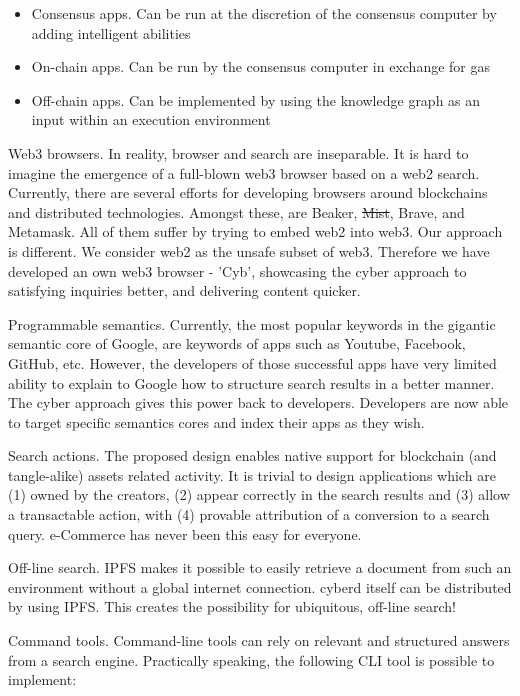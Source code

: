 \documentclass[8pt,oneside]{amsart}
\newcommand{\code}[1]{{\PlayBold #1}}
\begin{document}
\begin{Abstract}
\begin{itemize}
\item Consensus apps. Can be run at the discretion of the consensus computer by adding intelligent abilities
\item On-chain apps. Can be run by the consensus computer in exchange for gas
\item Off-chain apps. Can be implemented by using the knowledge graph as an input within an execution environment
\end{itemize}

\code{Web3 browsers}. In reality, browser and search are inseparable. It is hard to imagine the emergence of a full-blown web3 browser based on a web2 search. Currently, there are several efforts for developing browsers around blockchains and distributed technologies. Amongst these, are Beaker, \sout{Mist}, Brave, and Metamask. All of them suffer by trying to embed web2 into web3. Our approach is different. We consider web2 as the unsafe subset of web3. Therefore we have developed an own web3 browser - 'Cyb', showcasing the cyber approach to satisfying inquiries better, and delivering content quicker.

\code{Programmable semantics}. Currently, the most popular keywords in the gigantic semantic core of Google, are keywords of apps such as Youtube, Facebook, GitHub, etc. However, the developers of those successful apps have very limited ability to explain to Google how to structure search results in a better manner. The cyber approach gives this power back to developers. Developers are now able to target specific semantics cores and index their apps as they wish.

\code{Search actions}. The proposed design enables native support for blockchain (and tangle-alike) assets related activity. It is trivial to design applications which are (1) owned by the creators, (2) appear correctly in the search results and (3) allow a transactable action, with (4) provable attribution of a conversion to a search query. e-Commerce has never been this easy for everyone.

\code{Off-line search}. IPFS makes it possible to easily retrieve a document from such an environment without a global internet connection. cyberd itself can be distributed by using IPFS. This creates the possibility for ubiquitous, off-line search!

\code{Command tools}. Command-line tools can rely on relevant and structured answers from a search engine. Practically speaking, the following CLI tool is possible to implement:


\end{Abstract}
\end{document}

